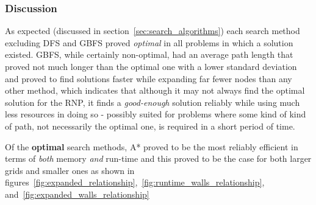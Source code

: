 \subsubsection{Discussion} %
\label{sub:discussion}
As expected (discussed in section~\ref{sec:search_algorithms}) each search method excluding DFS and GBFS proved \textit{optimal} in all problems in which a solution existed. GBFS, while certainly non-optimal, had an average path length that proved not much longer than the optimal one with a lower standard deviation and proved to find solutions faster while expanding far fewer nodes than any other method, which indicates that although it may not always find the optimal solution for the RNP, it finds a \textit{good-enough} solution reliably while using much less resources in doing so - possibly suited for problems where some kind of kind of path, not necessarily the optimal one, is required in a short period of time.
\par
Of the \textbf{optimal} search methods, A* proved to be the most reliably efficient in terms of \textit{both} memory \textit{and} run-time and this proved to be the case for both larger grids and smaller ones as shown in figures~\ref{fig:expanded_relationship},~\ref{fig:runtime_walls_relationship}, and~\ref{fig:expanded_walls_relationship}


